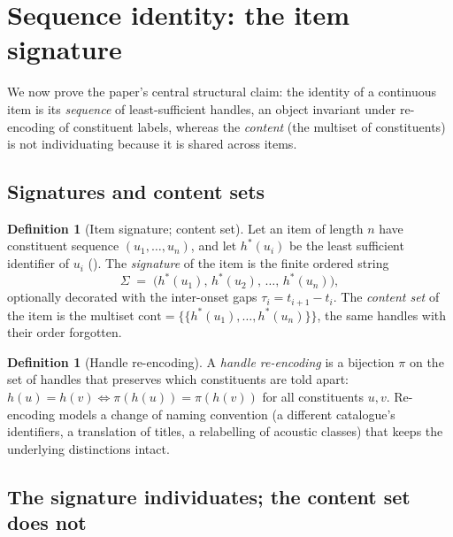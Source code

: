 \documentclass[11pt,twocolumn,a4paper]{article}
\theoremstyle{thmstyle}
\theoremstyle{definition}
\newtheorem{definition}[theorem]{Definition}
\theoremstyle{remark}
\newcommand{\hand}{h}
\newcommand{\sig}{\Sigma}
\begin{document}
\section{Sequence identity: the item signature}
\label{sec:signature}

We now prove the paper's central structural claim: the identity of a continuous
item is its \emph{sequence} of least-sufficient handles, an object invariant
under re-encoding of constituent labels, whereas the \emph{content} (the multiset
of constituents) is not individuating because it is shared across items.

\subsection{Signatures and content sets}

\begin{definition}[Item signature; content set]
\label{def:signature}
Let an item of length $n$ have constituent sequence $(u_1,\dots,u_n)$, and let
$\hand^{\ast}(u_i)$ be the least sufficient identifier of $u_i$
(). The \emph{signature} of the item is the finite ordered string
\[
\sig \;=\; \bigl(\hand^{\ast}(u_1),\,\hand^{\ast}(u_2),\,\dots,\,
              \hand^{\ast}(u_n)\bigr),
\]
optionally decorated with the inter-onset gaps $\tau_i=t_{i+1}-t_i$. The
\emph{content set} of the item is the multiset
$\mathrm{cont}=\{\!\{\hand^{\ast}(u_1),\dots,\hand^{\ast}(u_n)\}\!\}$, the same
handles with their order forgotten.
\end{definition}

\begin{definition}[Handle re-encoding]
\label{def:reencode}
A \emph{handle re-encoding} is a bijection $\pi$ on the set of handles that
preserves which constituents are told apart: $\hand(u)=\hand(v)\iff
\pi(\hand(u))=\pi(\hand(v))$ for all constituents $u,v$. Re-encoding models a
change of naming convention (a different catalogue's identifiers, a translation
of titles, a relabelling of acoustic classes) that keeps the underlying
distinctions intact.
\end{definition}

\subsection{The signature individuates; the content set does not}
\end{document}
